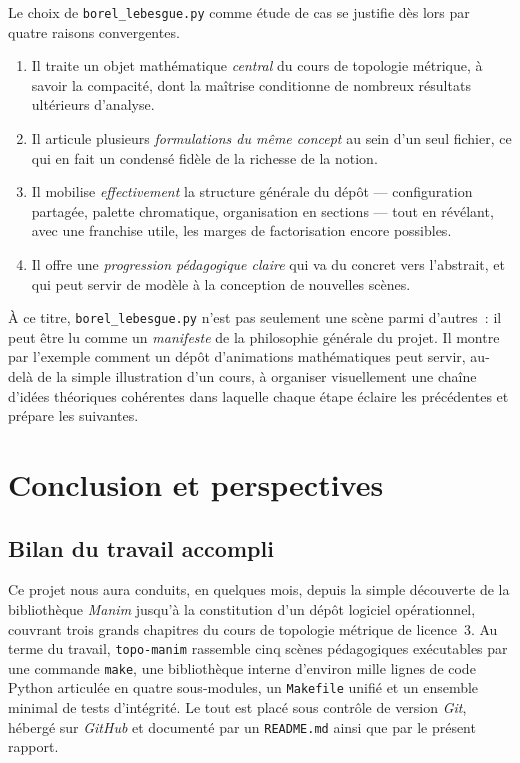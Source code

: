 \documentclass[12pt, a4paper, openany]{report}
\begin{document}
	Le choix de \texttt{borel\_lebesgue.py} comme étude de cas se justifie dès lors par quatre raisons convergentes.

	\begin{enumerate}
		\item Il traite un objet mathématique \emph{central} du cours de topologie métrique, à savoir la compacité, dont la maîtrise conditionne de nombreux résultats ultérieurs d’analyse.
		\item Il articule plusieurs \emph{formulations du même concept} au sein d’un seul fichier, ce qui en fait un condensé fidèle de la richesse de la notion.
		\item Il mobilise \emph{effectivement} la structure générale du dépôt — configuration partagée, palette chromatique, organisation en sections — tout en révélant, avec une franchise utile, les marges de factorisation encore possibles.
		\item Il offre une \emph{progression pédagogique claire} qui va du concret vers l’abstrait, et qui peut servir de modèle à la conception de nouvelles scènes.
	\end{enumerate}

	À ce titre, \texttt{borel\_lebesgue.py} n’est pas seulement une scène parmi d’autres~: il peut être lu comme un \emph{manifeste} de la philosophie générale du projet. Il montre par l’exemple comment un dépôt d’animations mathématiques peut servir, au-delà de la simple illustration d’un cours, à organiser visuellement une chaîne d’idées théoriques cohérentes dans laquelle chaque étape éclaire les précédentes et prépare les suivantes.

	\chapter{Conclusion et perspectives}\label{chap:conclusion}

	\section{Bilan du travail accompli}

	Ce projet nous aura conduits, en quelques mois, depuis la simple découverte de la bibliothèque \textit{Manim} jusqu’à la constitution d’un dépôt logiciel opérationnel, couvrant trois grands chapitres du cours de topologie métrique de licence~3. Au terme du travail, \texttt{topo-manim} rassemble cinq scènes pédagogiques exécutables par une commande \texttt{make}, une bibliothèque interne d’environ mille lignes de code Python articulée en quatre sous-modules, un \texttt{Makefile} unifié et un ensemble minimal de tests d’intégrité. Le tout est placé sous contrôle de version \textit{Git}, hébergé sur \textit{GitHub} et documenté par un \texttt{README.md} ainsi que par le présent rapport.
\end{document}
